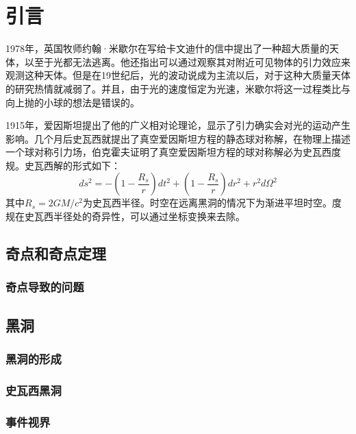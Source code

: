\chapter{引言}
1978年，英国牧师约翰·米歇尔在写给卡文迪什的信中提出了一种超大质量的天体，以至于光都无法逃离\citep{michell1784vii}。他还指出可以通过观察其对附近可见物体的引力效应来观测这种天体。但是在19世纪后，光的波动说成为主流以后，对于这种大质量天体的研究热情就减弱了。并且，由于光的速度恒定为光速，米歇尔将这一过程类比与向上抛的小球的想法是错误的。

1915年，爱因斯坦提出了他的广义相对论理论，显示了引力确实会对光的运动产生影响。几个月后史瓦西就提出了真空爱因斯坦方程的静态球对称解\citep{schwarzschild1916gravitationsfeld}，在物理上描述一个球对称引力场，伯克霍夫证明了真空爱因斯坦方程的球对称解必为史瓦西度规\citep{birkhoff1923relativity}。史瓦西解的形式如下：
\begin{equation}
    ds^2=-\left(1-\frac{R_s}{r}\right)dt^2+\left(1-\frac{R_s}{r}\right)dr^2+r^2d\Omega^2
\end{equation}
其中$R_s=2GM/c^2$为史瓦西半径。时空在远离黑洞的情况下为渐进平坦时空。度规在史瓦西半径处的奇异性，可以通过坐标变换来去除。
\section{奇点和奇点定理}
\subsection{奇点导致的问题}
\section{黑洞}
\subsection{黑洞的形成}
\subsection{史瓦西黑洞}

\subsection{事件视界}

